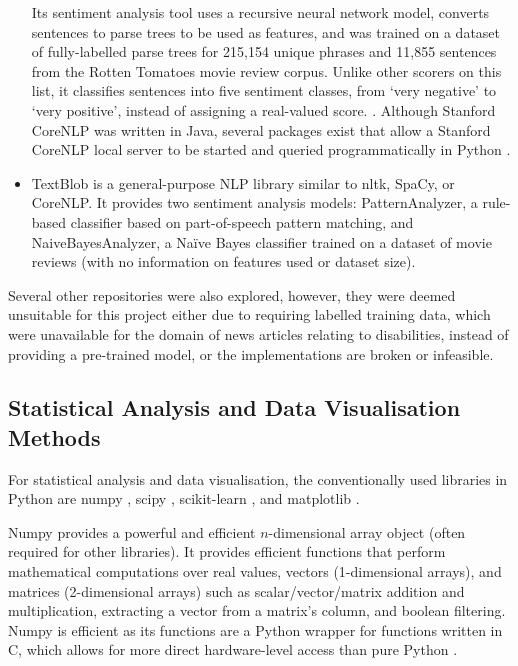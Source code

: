 \documentclass{report}
\begin{document}
\begin{itemize}
		Its sentiment analysis tool uses a recursive neural network model, converts sentences to parse trees to be used as features, and was trained on a dataset of fully-labelled parse trees for 215,154 unique phrases and 11,855 sentences from the Rotten Tomatoes movie review corpus. 
		Unlike other scorers on this list, it classifies sentences into five sentiment classes, from `very negative' to `very positive', instead of assigning a real-valued score. \cite{socher2013recursive}.
		Although Stanford CoreNLP was written in Java, several packages exist that allow a Stanford CoreNLP local server to be started and queried programmatically in Python \cite{stanfordcorenlp}.
	\item TextBlob \cite{textblob} is a general-purpose NLP library similar to nltk, SpaCy, or CoreNLP.
		It provides two sentiment analysis models: PatternAnalyzer, a rule-based classifier based on part-of-speech pattern matching, and NaiveBayesAnalyzer, a Na\"{i}ve Bayes classifier trained on a dataset of movie reviews (with no information on features used or dataset size). 
\end{itemize}

Several other repositories were also explored, however, they were deemed unsuitable for this project either due to requiring labelled training data, which were unavailable for the domain of news articles relating to disabilities, instead of providing a pre-trained model, or the implementations are broken or infeasible.

\subsection{Statistical Analysis and Data Visualisation Methods} \label{tc-visualisation}
For statistical analysis and data visualisation, the conventionally used libraries in Python are numpy \cite{Numpy}, scipy \cite{Scipy}, scikit-learn \cite{Scikit-learn}, and matplotlib \cite{Matplotlib}.

Numpy \cite{Numpy} provides a powerful and efficient $n$-dimensional array object (often required for other libraries).
It provides efficient functions that perform mathematical computations over real values, vectors (1-dimensional arrays), and matrices (2-dimensional arrays) such as scalar/vector/matrix addition and multiplication, extracting a vector from a matrix's column, and boolean filtering.
Numpy is efficient as its functions are a Python wrapper for functions written in C, which allows for more direct hardware-level access than pure Python \cite{Numpy-c}.
\end{document}
